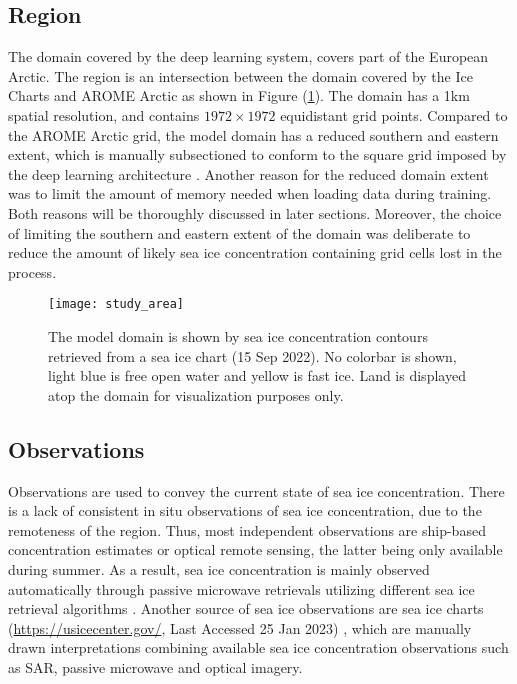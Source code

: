 \documentclass[../main/thesis.tex]{subfiles}
\begin{document}
\subsection{Region}
The domain covered by the deep learning system, covers part of the European Arctic. The region is an intersection between the domain covered by the Ice Charts \citep{Dinessen2020} and AROME Arctic \citep{Mueller2017} as shown in Figure (\ref{fig:studyarea}). The domain has a 1km spatial resolution, and contains $1972 \times 1972$ equidistant grid points. Compared to the AROME Arctic grid, the model domain has a reduced southern and eastern extent, which is manually subsectioned to conform to the square grid imposed by the deep learning architecture \citep{Ronneberger2015}. Another reason for the reduced domain extent was to limit the amount of memory needed when loading data during training. Both reasons will be thoroughly discussed in later sections. Moreover, the choice of limiting the southern and eastern extent of the domain was deliberate to reduce the amount of likely sea ice concentration containing grid cells lost in the process.

\begin{figure}
    \centering
    \texttt{[image: study\_area]}
    \caption{\label{fig:studyarea}The model domain is shown by sea ice concentration contours retrieved from a sea ice chart (15 Sep 2022). No colorbar is shown, light blue is free open water and yellow is fast ice. Land is displayed atop the domain for visualization purposes only.}
\end{figure}



\subsection{Observations}
Observations are used to convey the current state of sea ice concentration. There is a lack of consistent in situ observations of sea ice concentration, due to the remoteness of the region. Thus, most independent observations are ship-based concentration estimates \citep{Kern2019} or optical remote sensing, the latter being only available during summer. As a result, sea ice concentration is mainly observed automatically through passive microwave retrievals utilizing different sea ice retrieval algorithms \citep{Lavergne2019a, Comiso1997,Spreen2008}. Another source of sea ice observations are sea ice charts (\url{https://usicecenter.gov/}, Last Accessed 25 Jan 2023) \citep{Dinessen2020}, which are manually drawn interpretations combining available sea ice concentration observations such as SAR, passive microwave and optical imagery. 
\end{document}
